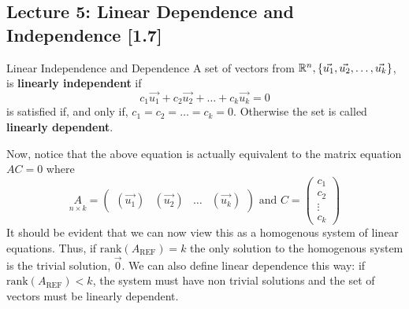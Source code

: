 \subsection{Lecture 5: Linear Dependence and Independence [1.7]}

\begin{defbox}{Linear Independence and Dependence}{}
    A set of vectors from $\mathbb R^{n}, \left\{\vec{u_1}, \vec{u_2}, \dots, \vec{u_k} \right\}$, is \textbf{linearly independent} if 
    \[c_1\vec{u_1} + c_2\vec{u_2} + \dots + c_k\vec{u_k} = 0\]
    is satisfied if, and only if, $c_1 = c_2 = \dots = c_k = 0$. Otherwise the set is called \textbf{linearly dependent}.
\end{defbox}

Now, notice that the above equation is actually equivalent to the matrix equation $AC=0$ where
\[
    \underset{n\times k}{A} = 
    \begin{pmatrix}
        \left(\vec{u_1}\right) & \left(\vec{u_2}\right) & \dots & \left(\vec{u_k}\right)
    \end{pmatrix}
    \text{ and }
    C = 
    \begin{pmatrix}
        c_1 \\ c_2 \\ \vdots \\ c_k
    \end{pmatrix}
\]
It should be evident that we can now view this as a homogenous system of linear equations. Thus, if $\text{rank}\left(A_{\text{REF}}\right) = k$ the only solution to the homogenous system is the trivial solution, $\vec{0}$. We can also define linear dependence this way: if $\text{rank}\left(A_{\text{REF}}\right) < k$, the system must have non trivial solutions and the set of vectors must be linearly dependent.

